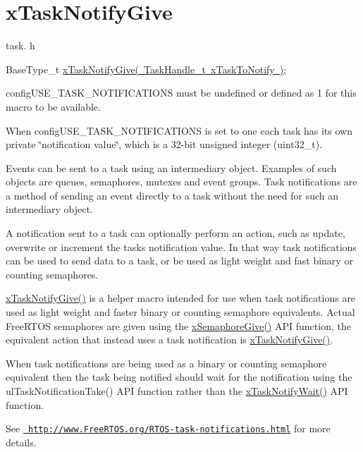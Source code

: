 \hypertarget{group__x_task_notify_give}{}\section{x\+Task\+Notify\+Give}
\label{group__x_task_notify_give}
task. h 
\begin{DoxyPre}BaseType\_t \mbox{\hyperlink{task_8h_ac60cbd05577a3e4f3c3587dd9b213930}{xTaskNotifyGive( TaskHandle\_t xTaskToNotify )}};\end{DoxyPre}


config\+U\+S\+E\+\_\+\+T\+A\+S\+K\+\_\+\+N\+O\+T\+I\+F\+I\+C\+A\+T\+I\+O\+NS must be undefined or defined as 1 for this macro to be available.

When config\+U\+S\+E\+\_\+\+T\+A\+S\+K\+\_\+\+N\+O\+T\+I\+F\+I\+C\+A\+T\+I\+O\+NS is set to one each task has its own private \char`\"{}notification value\char`\"{}, which is a 32-\/bit unsigned integer (uint32\+\_\+t).

Events can be sent to a task using an intermediary object. Examples of such objects are queues, semaphores, mutexes and event groups. Task notifications are a method of sending an event directly to a task without the need for such an intermediary object.

A notification sent to a task can optionally perform an action, such as update, overwrite or increment the task\textquotesingle{}s notification value. In that way task notifications can be used to send data to a task, or be used as light weight and fast binary or counting semaphores.

\mbox{\hyperlink{task_8h_ac60cbd05577a3e4f3c3587dd9b213930}{x\+Task\+Notify\+Give()}} is a helper macro intended for use when task notifications are used as light weight and faster binary or counting semaphore equivalents. Actual Free\+R\+T\+OS semaphores are given using the \mbox{\hyperlink{semphr_8h_aae55761cabfa9bf85c8f4430f78c0953}{x\+Semaphore\+Give()}} A\+PI function, the equivalent action that instead uses a task notification is \mbox{\hyperlink{task_8h_ac60cbd05577a3e4f3c3587dd9b213930}{x\+Task\+Notify\+Give()}}.

When task notifications are being used as a binary or counting semaphore equivalent then the task being notified should wait for the notification using the ul\+Task\+Notification\+Take() A\+PI function rather than the \mbox{\hyperlink{task_8h_a0475fcda9718f403521c270a7270ff93}{x\+Task\+Notify\+Wait()}} A\+PI function.

See \href{http://www.FreeRTOS.org/RTOS-task-notifications.html}{\texttt{ http\+://www.\+Free\+R\+T\+O\+S.\+org/\+R\+T\+O\+S-\/task-\/notifications.\+html}} for more details.


